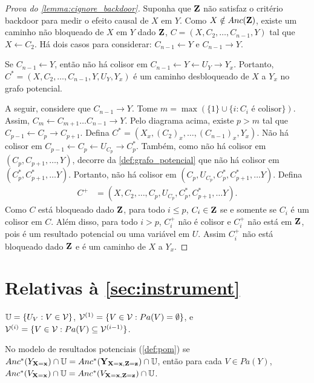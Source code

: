 \begin{proof}[Prova do \cref{lemma:cignore_backdoor}]
 Suponha que ${\mathbf{Z}}$ não satisfaz 
 o critério backdoor para medir o efeito causal de $X$ em $Y$.
 Como $X \notin Anc({\mathbf{Z}})$, existe 
 um caminho não bloqueado de $X$ em $Y$ dado ${\mathbf{Z}}$,
 $C = (X, C_2, \ldots, C_{n-1}, Y)$ tal que
 $X \leftarrow C_2$.
 Há dois casos para considerar:
 $C_{n-1} \leftarrow Y$ e $C_{n-1} \rightarrow Y$.
 
 Se $C_{n-1} \leftarrow Y$, então
 não há colisor em 
 $C_{n-1} \leftarrow Y \leftarrow U_Y \rightarrow Y_x$.
 Portanto, $C^* = (X, C_2, \ldots, C_{n-1}, Y, U_Y, Y_x)$ é
 um caminho desbloqueado de $X$ a $Y_x$ no grafo potencial.
 
 A seguir, considere que $C_{n-1} \rightarrow Y$.
 Tome $m = \max(\{1\} \cup \{i: C_i \text{ é colisor} \})$. 
 Assim, $C_m \leftarrow C_{m+1} \ldots C_{n-1} \rightarrow Y$.
 Pelo diagrama acima, existe $p > m$ tal que 
 $C_{p-1} \leftarrow C_p \rightarrow C_{p+1}$.
 Defina $C^* = (X_x, (C_2)_x, \ldots, (C_{n-1})_x, Y_x)$.
 Não há colisor em 
 $C_{p-1} \leftarrow C_p \leftarrow U_{C_p} \rightarrow C^*_p$.
 Também, como não há colisor em $(C_p, C_{p+1}, \ldots, Y)$,
 decorre da \cref{def:grafo_potencial} que
 não há colisor em $(C^*_p, C^*_{p+1}, \ldots Y)$.
 Portanto, não há colisor em
 $(C_p, U_{C_p}, C^*_p, C^*_{p+1}, \ldots Y)$.
 Defina 
 \begin{align*}
  C^+ &= (X, C_2, \ldots, C_p, U_{C_p}, C^*_p, C^*_{p+1}, \ldots Y).
 \end{align*}
 Como $C$ está bloqueado dado ${\mathbf{Z}}$,
 para todo $i \leq p$, $C_i \in {\mathbf{Z}}$ 
 se e somente se $C_i$ é um colisor em $C$.
 Além disso, para todo $i > p$,
 $C^+_i$ não é colisor e 
 $C^+_i$ não está em ${\mathbf{Z}}$, pois
 é um resultado potencial ou uma variável em $U$.
 Assim $C^+_i$ não está bloqueado dado ${\mathbf{Z}}$ e
 é um caminho de $X$ a $Y_x$.
\end{proof}

\section{Relativas à \cref{sec:instrument}}

\begin{definition}
 \label{def:pom_partition}
 ${\mathbb U} = \{U_V: V \in {\mathcal V}\}$,
 ${\mathcal V}^{(1)} = \{V \in {\mathcal V}: Pa(V) = \emptyset\}$, e
 ${\mathcal V}^{(i)} = \{V \in {\mathcal V}: Pa(V) \subseteq {\mathcal V}^{(i-1)}\}$.
\end{definition}

\begin{lemma}
 \label{lemma:pom_anc}
 No modelo de resultados potenciais (\cref{def:pom})
 se $Anc^*(Y_{{\mathbf{X}}={\mathbf{x}}}) \cap {\mathbb U} = Anc^*({\mathbf{Y}}_{{\mathbf{X}}={\mathbf{x}},{\mathbf{Z}}={\mathbf{z}}}) \cap {\mathbb U}$,
 então para cada $V \in Pa(Y)$,
 $Anc^*(V_{{\mathbf{X}}={\mathbf{x}}}) \cap {\mathbb U} = Anc^*(V_{{\mathbf{X}}={\mathbf{x}},{\mathbf{Z}}={\mathbf{z}}}) \cap {\mathbb U}$.
\end{lemma}

